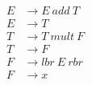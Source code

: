 \begin{align*}
E &\rightarrow E\ add\ T \\
E &\rightarrow T \\
T &\rightarrow T\ mult\ F \\
T &\rightarrow F \\
F &\rightarrow lbr\ E\ rbr \\
F &\rightarrow x \\
\end{align*}